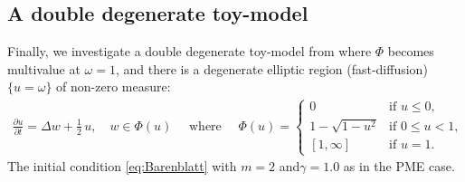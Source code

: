 \documentclass[review,11pt]{article}
\newcounter{subsubsubsection}
\numberwithin{equation}{section}
\def \g  {\gamma}
\def \vs  {\omega}
\def \om {\omega}
\newcommand\KM[1]{%
  \protect\leavevmode
  \begingroup
        \color{red!55!yellow}%
        #1%
  \endgroup
}
\begin{document}


\subsection{A double degenerate toy-model}\label{sec:toy}
Finally, we investigate a double degenerate toy-model from \cite{javed2025robust} where $\Phi$ becomes multivalue at $\vs=1$, and there is a degenerate elliptic region (fast-diffusion)  $\{u=\om\}$ of non-zero measure:
\begin{align}\label{eq:toy}
\frac{\partial u}{\partial t} = \Delta w+ \frac{1}{2}\, u , \quad  w \in \Phi( u) \quad \text{ where } \quad \Phi(u) =
\begin{cases}
0 & \text{if } u \leq 0, \\
1-\sqrt{1-u^2} & \text{if } 0 \leq u < 1,\\
 [1, \infty] & \text{if } u = 1.
\end{cases}
\end{align}
The initial condition \eqref{eq:Barenblatt} with $m=2$ and$\g=1.0$ as in the PME case.
\end{document}
